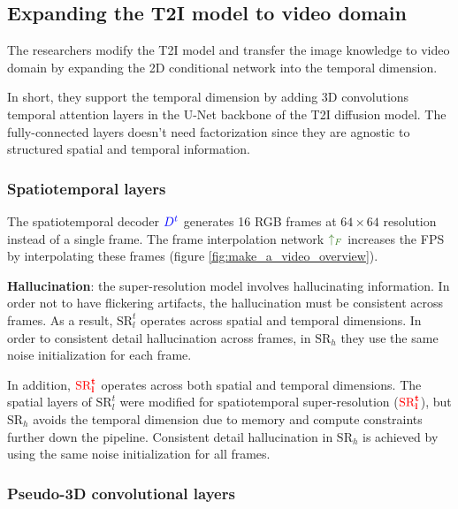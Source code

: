 \subsection{Expanding the T2I model to video domain}
\label{sec:make_a_video_expanding_t2i_to_video}

The researchers modify the T2I model and transfer the image knowledge to video domain by expanding the 2D conditional network into the temporal dimension.

In short, they support the temporal dimension by adding 3D convolutions temporal attention layers in the U-Net backbone of the T2I diffusion model. The fully-connected layers doesn't need factorization since they are agnostic to structured spatial and temporal information.





\subsubsection{Spatiotemporal layers}


The spatiotemporal decoder $\textcolor{blue}{D^t}$ generates 16 RGB frames at $64\times 64$ resolution instead of a single frame. The frame interpolation network $\textcolor{OliveGreen}{\uparrow_F}$ increases the FPS by interpolating these frames (figure \ref{fig:make_a_video_overview}).

\textbf{Hallucination}: the super-resolution model involves hallucinating information. In order not to have flickering artifacts, the hallucination must be consistent across frames. As a result, $\text{SR}_l^t$ operates across spatial and temporal dimensions. In order to consistent detail hallucination across frames, in $\text{SR}_h$ they use the same noise initialization for each frame.

In addition, $\textcolor{red}{\mathbf{\text{SR}_l^t}}$ operates across both spatial and temporal dimensions. The spatial layers of $\text{SR}_l^t$  were modified for spatiotemporal super-resolution ($\textcolor{red}{\mathbf{\text{SR}_l^t}}$), but $\text{SR}_h$ avoids the temporal dimension due to memory and compute constraints further down the pipeline. Consistent detail hallucination in $\text{SR}_h$ is achieved by using the same noise initialization for all frames.









\subsubsection{Pseudo-3D convolutional layers}

